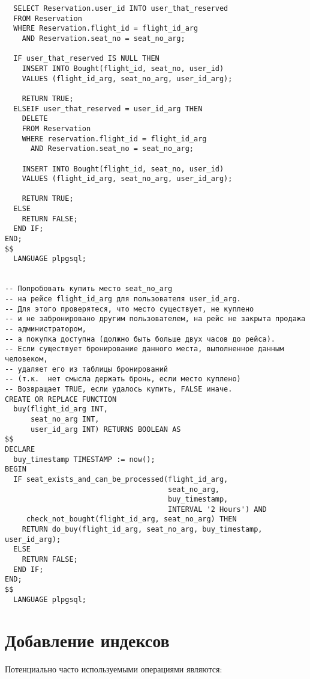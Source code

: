 \documentclass{article}
\begin{document}
\begin{verbatim}
  SELECT Reservation.user_id INTO user_that_reserved
  FROM Reservation
  WHERE Reservation.flight_id = flight_id_arg
    AND Reservation.seat_no = seat_no_arg;

  IF user_that_reserved IS NULL THEN
    INSERT INTO Bought(flight_id, seat_no, user_id)
    VALUES (flight_id_arg, seat_no_arg, user_id_arg);

    RETURN TRUE;
  ELSEIF user_that_reserved = user_id_arg THEN
    DELETE
    FROM Reservation
    WHERE reservation.flight_id = flight_id_arg
      AND Reservation.seat_no = seat_no_arg;

    INSERT INTO Bought(flight_id, seat_no, user_id)
    VALUES (flight_id_arg, seat_no_arg, user_id_arg);

    RETURN TRUE;
  ELSE
    RETURN FALSE;
  END IF;
END;
$$
  LANGUAGE plpgsql;


-- Попробовать купить место seat_no_arg
-- на рейсе flight_id_arg для пользователя user_id_arg.
-- Для этого проверятеся, что место существует, не куплено
-- и не забронировано другим пользователем, на рейс не закрыта продажа
-- администратором,
-- а покупка доступна (должно быть больше двух часов до рейса).
-- Если существует бронирование данного места, выполненное данным человеком,
-- удаляет его из таблицы бронирований
-- (т.к.  нет смысла держать бронь, если место куплено)
-- Возвращает TRUE, если удалось купить, FALSE иначе.
CREATE OR REPLACE FUNCTION
  buy(flight_id_arg INT,
      seat_no_arg INT,
      user_id_arg INT) RETURNS BOOLEAN AS
$$
DECLARE
  buy_timestamp TIMESTAMP := now();
BEGIN
  IF seat_exists_and_can_be_processed(flight_id_arg,
                                      seat_no_arg,
                                      buy_timestamp,
                                      INTERVAL '2 Hours') AND
     check_not_bought(flight_id_arg, seat_no_arg) THEN
    RETURN do_buy(flight_id_arg, seat_no_arg, buy_timestamp, user_id_arg);
  ELSE
    RETURN FALSE;
  END IF;
END;
$$
  LANGUAGE plpgsql;
\end{verbatim}

\section{Добавление индексов}

Потенциально часто используемыми операциями являются:
\end{document}
